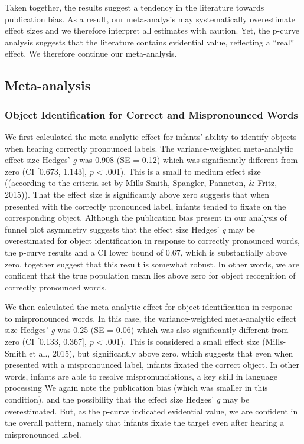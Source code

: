 \documentclass[man]{apa6}
\theoremstyle{definition}
\theoremstyle{definition}
\theoremstyle{definition}
\theoremstyle{remark}
\begin{document}
Taken together, the results suggest a tendency in the literature towards
publication bias. As a result, our meta-analysis may systematically
overestimate effect sizes and we therefore interpret all estimates with
caution. Yet, the p-curve analysis suggests that the literature contains
evidential value, reflecting a \enquote{real} effect. We therefore
continue our meta-analysis.

\subsection{Meta-analysis}\label{meta-analysis-1}

\subsubsection{Object Identification for Correct and Mispronounced
Words}\label{object-identification-for-correct-and-mispronounced-words}

We first calculated the meta-analytic effect for infants' ability to
identify objects when hearing correctly pronounced labels. The
variance-weighted meta-analytic effect size Hedges' \emph{g} was 0.908
(SE = 0.12) which was significantly different from zero (CI {[}0.673,
1.143{]}, \emph{p} \textless{} .001). This is a small to medium effect
size ((according to the criteria set by Mills-Smith, Spangler, Panneton,
\& Fritz, 2015)). That the effect size is significantly above zero
suggests that when presented with the correctly pronounced label,
infants tended to fixate on the corresponding object. Although the
publication bias present in our analysis of funnel plot asymmetry
suggests that the effect size Hedges' \emph{g} may be overestimated for
object identification in response to correctly pronounced words, the
p-curve results and a CI lower bound of 0.67, which is substantially
above zero, together suggest that this result is somewhat robust. In
other words, we are confident that the true population mean lies above
zero for object recognition of correctly pronounced words.

We then calculated the meta-analytic effect for object identification in
response to mispronounced words. In this case, the variance-weighted
meta-analytic effect size Hedges' \emph{g} was 0.25 (SE = 0.06) which
was also significantly different from zero (CI {[}0.133, 0.367{]},
\emph{p} \textless{} .001). This is considered a small effect size
(Mills-Smith et al., 2015), but significantly above zero, which suggests
that even when presented with a mispronounced label, infants fixated the
correct object. In other words, infants are able to resolve
mispronunciations, a key skill in language processing We again note the
publication bias (which was smaller in this condition), and the
possibility that the effect size Hedges' \emph{g} may be overestimated.
But, as the p-curve indicated evidential value, we are confident in the
overall pattern, namely that infants fixate the target even after
hearing a mispronounced label.
\end{document}
